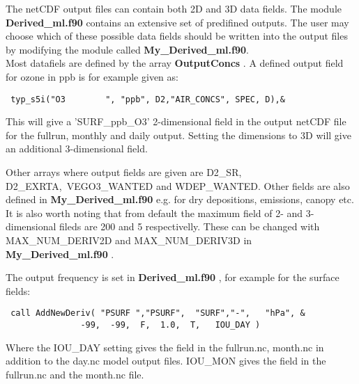 The netCDF output files can contain both 2D and 3D data fields. The module 
{ \bf Derived\_ml.f90 } contains an extensive set of predifined outputs. 
The user may choose which of these possible data fields should be written 
into the output files by modifying the module called { \bf My\_Derived\_ml.f90}.\\

Most datafiels are defined by the array {\bf OutputConcs }. A defined output 
field for ozone in ppb is for example given  as:
\begin{verbatim}
 typ_s5i("O3        ", "ppb", D2,"AIR_CONCS", SPEC, D),& 
\end{verbatim}

This will give a 'SURF\_ppb\_O3' 2-dimensional field in the output netCDF file for 
the fullrun, monthly and daily output. 
Setting the dimensions to 3D will give an additional 3-dimensional field. 


Other arrays where output fields are given are D2\_SR, D2\_EXRTA,\
 VEGO3\_WANTED and 
WDEP\_WANTED. Other fields are also defined in { \bf My\_Derived\_ml.f90 } e.g. for dry 
depositions, emissions, canopy etc. \\



It is also worth noting that from default the maximum field of 2- and 3-dimensional fileds 
are 200 and 5 respectivelly. These can be changed with MAX\_NUM\_DERIV2D and MAX\_NUM\_DERIV3D 
in { \bf My\_Derived\_ml.f90 }.


The output frequency is set in { \bf Derived\_ml.f90 }, for example for the surface fields:

\begin{verbatim}
 call AddNewDeriv( "PSURF ","PSURF",  "SURF","-",   "hPa", &
               -99,  -99,  F,  1.0,  T,   IOU_DAY )
\end{verbatim}

 Where the IOU\_DAY setting gives the field in the fullrun.nc, month.nc in addition to the day.nc 
model output files. IOU\_MON gives the field in the fullrun.nc and the month.nc file. 



